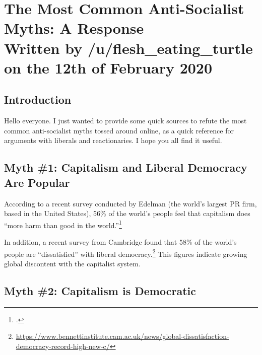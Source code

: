 \section[The Most Common Anti-Socialist Myths]{The Most Common Anti-Socialist Myths: A Response\\\small{Written by /u/flesh\_eating\_turtle on the 12th of February 2020}}
\subsection*{Introduction}

Hello everyone.
I just wanted to provide some quick sources to refute the most common anti-socialist myths tossed around online, as a quick reference for arguments with liberals and reactionaries.
I hope you all find it useful.

\subsection*{Myth \#1: Capitalism and Liberal Democracy Are Popular}

According to a recent survey conducted by Edelman (the world's largest PR firm, based in the United States), 56\% of the world's people feel that capitalism does ``more harm than good in the world.''\footcite{john-capitalism}

In addition, a recent survey from Cambridge found that 58\% of the world's people are ``dissatisfied'' with liberal democracy.\footnote{\href{https://www.bennettinstitute.cam.ac.uk/news/global-dissatisfaction-democracy-record-high-new-c/}{https://www.bennettinstitute.cam.ac.uk/news/global-dissatisfaction-democracy-record-high-new-c/}}
This figures indicate growing global discontent with the capitalist system.

\subsection*{Myth \#2: Capitalism is Democratic}


